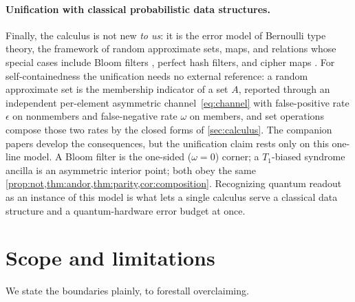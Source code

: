 \documentclass[12pt]{article}
\numberwithin{equation}{section}
\theoremstyle{plain}
\theoremstyle{definition}
\theoremstyle{remark}
\newcommand{\eps}{\epsilon}
\begin{document}
\paragraph{Unification with classical probabilistic data structures.}
Finally, the calculus is not new \emph{to us}: it is the error model of Bernoulli
type theory, the framework of random approximate sets, maps, and relations whose
special cases include Bloom filters \citep{bloom1970}, perfect hash filters, and
cipher maps \citep{bernoulliSets,bernoulliComposition,bernoulliMaps,bernoulliRelations}.
For self-containedness the unification needs no external reference: a random
approximate set is the membership indicator of a set $A$, reported through an
independent per-element asymmetric channel~\eqref{eq:channel} with false-positive
rate $\eps$ on nonmembers and false-negative rate $\omega$ on members, and set
operations compose those two rates by the closed forms of \cref{sec:calculus}. The
companion papers develop the consequences, but the unification claim rests only on
this one-line model.
A Bloom filter is the one-sided ($\omega=0$) corner; a $T_1$-biased syndrome
ancilla is an asymmetric interior point; both obey the same
\cref{prop:not,thm:andor,thm:parity,cor:composition}. Recognizing quantum readout
as an instance of this model is what lets a single calculus serve a classical
data structure and a quantum-hardware error budget at once.


\section{Scope and limitations}
\label{sec:scope}

We state the boundaries plainly, to forestall overclaiming.
\end{document}
